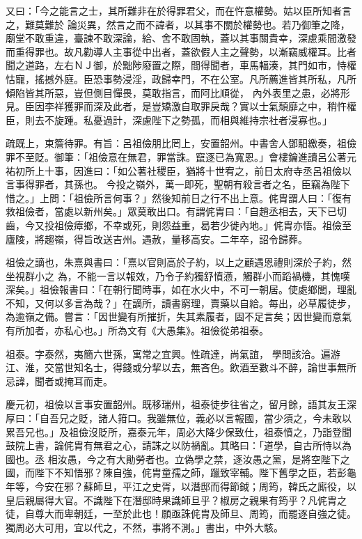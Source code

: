 \begin{pinyinscope}
 又曰：「今之能言之士，其所難非在於得罪君父，而在忤意權勢。姑以臣所知者言之，難莫難於
 論災異，然言之而不諱者，以其事不關於權勢也。若乃御筆之降，廟堂不敢重違，臺諫不敢深論，給、舍不敢固執，蓋以其事關貴幸，深慮乘間激發而重得罪也。故凡勸導人主事從中出者，蓋欲假人主之聲勢，以漸竊威權耳。比者聞之道路，左右ＮＪ御，於黜陟廢置之際，間得聞者，車馬輻湊，其門如市，恃權怙寵，搖撼外庭。臣恐事勢浸淫，政歸幸門，不在公室。凡所薦進皆其所私，凡所傾陷皆其所惡，豈但側目憚畏，莫敢指言，而阿比順從，
 內外表里之患，必將形見。臣因李祥獲罪而深及此者，是豈矯激自取罪戾哉？實以士氣頹靡之中，稍忤權臣，則去不旋踵。私憂過計，深慮陛下之勢孤，而相與維持宗社者浸寡也。」



 疏既上，束簷待罪。有旨：呂祖儉朋比罔上，安置韶州。中書舍人鄧馹繳奏，祖儉罪不至貶。御筆：「祖儉意在無君，罪當誅。竄逐已為寬恩。」會樓鑰進讀呂公著元祐初所上十事，因進曰：「如公著社稷臣，猶將十世宥之，前日太府寺丞呂祖儉以言事得罪者，其孫也。
 今投之嶺外，萬一即死，聖朝有殺言者之名，臣竊為陛下惜之。」上問：「祖儉所言何事？」然後知前日之行不出上意。侂胄謂人曰：「復有救祖儉者，當處以新州矣。」眾莫敢出口。有謂侂胄曰：「自趙丞相去，天下已切齒，今又投祖儉瘴鄉，不幸或死，則怨益重，曷若少徙內地。」侂胄亦悟。祖儉至廬陵，將趨嶺，得旨改送吉州。遇赦，量移高安。二年卒，詔令歸葬。



 祖儉之謫也，朱熹與書曰：「熹以官則高於子約，以上之顧遇恩禮則深於子約，然坐視群小之
 為，不能一言以報效，乃令子約獨舒憤懣，觸群小而蹈禍機，其愧嘆深矣。」祖儉報書曰：「在朝行聞時事，如在水火中，不可一朝居。使處鄉閭，理亂不知，又何以多言為哉？」在謫所，讀書窮理，賣藥以自給。每出，必草履徒步，為逾嶺之備。嘗言：「因世變有所摧折，失其素履者，固不足言矣；因世變而意氣有所加者，亦私心也。」所為文有《大愚集》。祖儉從弟祖泰。



 祖泰。字泰然，夷簡六世孫，寓常之宜興。性疏達，尚氣誼，
 學問該洽。遍游江、淮，交當世知名士，得錢或分挈以去，無吝色。飲酒至數斗不醉，論世事無所忌諱，聞者或掩耳而走。



 慶元初，祖儉以言事安置韶州。既移瑞州，祖泰徒步往省之，留月餘，語其友王深厚曰：「自吾兄之貶，諸人箝口。我雖無位，義必以言報國，當少須之，今未敢以累吾兄也。」及祖儉沒貶所，嘉泰元年，周必大降少保致仕，祖泰憤之，乃詣登聞鼓院上書，論侂胄有無君之心，請誅之以防禍亂。其略曰：「道學，自古所恃以為國也。丞
 相汝愚，今之有大勛勞者也。立偽學之禁，逐汝愚之黨，是將空陛下之國，而陛下不知悟邪？陳自強，侂胄童孺之師，躐致宰輔。陛下舊學之臣，若彭龜年等，今安在邪？蘇師旦，平江之史胥，以潛邸而得節鉞；周筠，韓氏之廝役，以皇后親屬得大官。不識陛下在潛邸時果識師旦乎？椒房之親果有筠乎？凡侂胄之徒，自尊大而卑朝廷，一至於此也！願亟誅侂胄及師旦、周筠，而罷逐自強之徒。獨周必大可用，宜以代之，不然，事將不測。」書出，中外大駭。




\end{pinyinscope}
